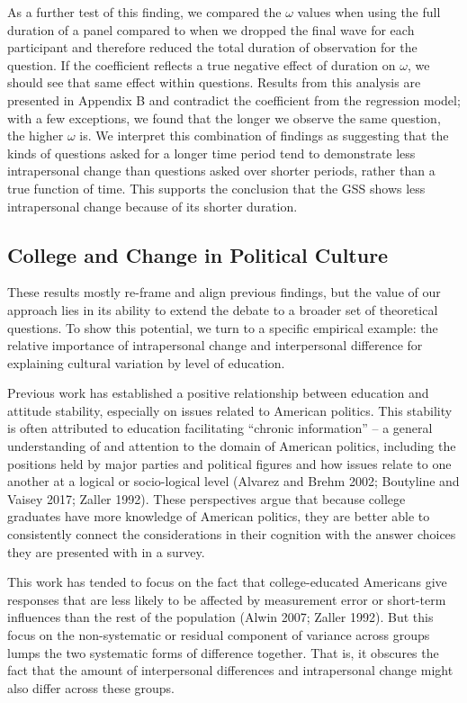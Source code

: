 \documentclass[
  12pt,
]{article}
\begin{document}
As a further test of this finding, we compared the \(\omega\) values
when using the full duration of a panel compared to when we dropped the
final wave for each participant and therefore reduced the total duration
of observation for the question. If the coefficient reflects a true
negative effect of duration on \(\omega\), we should see that same
effect within questions. Results from this analysis are presented in
Appendix B and contradict the coefficient from the regression model;
with a few exceptions, we found that the longer we observe the same
question, the higher \(\omega\) is. We interpret this combination of
findings as suggesting that the kinds of questions asked for a longer
time period tend to demonstrate less intrapersonal change than questions
asked over shorter periods, rather than a true function of time. This
supports the conclusion that the GSS shows less intrapersonal change
because of its shorter duration.

\hypertarget{college-and-change-in-political-culture}{%
\subsection{College and Change in Political
Culture}\label{college-and-change-in-political-culture}}

These results mostly re-frame and align previous findings, but the value
of our approach lies in its ability to extend the debate to a broader
set of theoretical questions. To show this potential, we turn to a
specific empirical example: the relative importance of intrapersonal
change and interpersonal difference for explaining cultural variation by
level of education.

Previous work has established a positive relationship between education
and attitude stability, especially on issues related to American
politics. This stability is often attributed to education facilitating
``chronic information'' -- a general understanding of and attention to
the domain of American politics, including the positions held by major
parties and political figures and how issues relate to one another at a
logical or socio-logical level (Alvarez and Brehm 2002; Boutyline and
Vaisey 2017; Zaller 1992). These perspectives argue that because college
graduates have more knowledge of American politics, they are better able
to consistently connect the considerations in their cognition with the
answer choices they are presented with in a survey.

This work has tended to focus on the fact that college-educated
Americans give responses that are less likely to be affected by
measurement error or short-term influences than the rest of the
population (Alwin 2007; Zaller 1992). But this focus on the
non-systematic or residual component of variance across groups lumps the
two systematic forms of difference together. That is, it obscures the
fact that the amount of interpersonal differences and intrapersonal
change might also differ across these groups.
\end{document}
